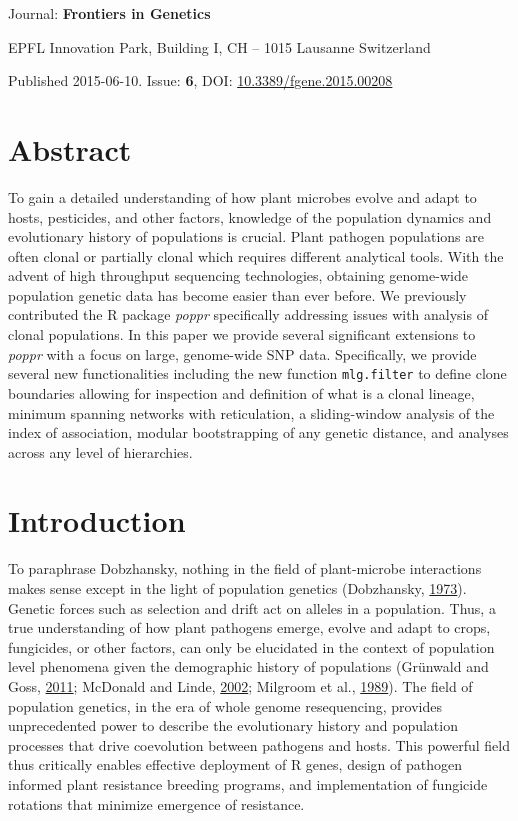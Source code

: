 \documentclass[double,12pt]{beavtex}
\begin{document}
  Journal: \textbf{Frontiers in Genetics}
  
  EPFL Innovation Park, Building I, CH -- 1015 Lausanne Switzerland
  
  Published 2015-06-10. Issue: \textbf{6}, DOI:
  \href{http://dx.doi.org/10.3389/fgene.2015.00208}{10.3389/fgene.2015.00208}
  
  \doublespacing
  \newpage
  
  \section{Abstract}\label{abstract-1}
  
  To gain a detailed understanding of how plant microbes evolve and adapt
  to hosts, pesticides, and other factors, knowledge of the population
  dynamics and evolutionary history of populations is crucial. Plant
  pathogen populations are often clonal or partially clonal which requires
  different analytical tools. With the advent of high throughput
  sequencing technologies, obtaining genome-wide population genetic data
  has become easier than ever before. We previously contributed the R
  package \emph{poppr} specifically addressing issues with analysis of
  clonal populations. In this paper we provide several significant
  extensions to \emph{poppr} with a focus on large, genome-wide SNP data.
  Specifically, we provide several new functionalities including the new
  function \texttt{mlg.filter} to define clone boundaries allowing for
  inspection and definition of what is a clonal lineage, minimum spanning
  networks with reticulation, a sliding-window analysis of the index of
  association, modular bootstrapping of any genetic distance, and analyses
  across any level of hierarchies.
  
  \section{Introduction}\label{introduction-1}
  
  To paraphrase Dobzhansky, nothing in the field of plant-microbe
  interactions makes sense except in the light of population genetics
  (Dobzhansky, \protect\hyperlink{ref-dobzhansky2013nothing}{1973}).
  Genetic forces such as selection and drift act on alleles in a
  population. Thus, a true understanding of how plant pathogens emerge,
  evolve and adapt to crops, fungicides, or other factors, can only be
  elucidated in the context of population level phenomena given the
  demographic history of populations (Grünwald and Goss,
  \protect\hyperlink{ref-grunwald2011evolution}{2011}; McDonald and Linde,
  \protect\hyperlink{ref-Mcdonald2002}{2002}; Milgroom et al.,
  \protect\hyperlink{ref-milgroom1989population}{1989}). The field of
  population genetics, in the era of whole genome resequencing, provides
  unprecedented power to describe the evolutionary history and population
  processes that drive coevolution between pathogens and hosts. This
  powerful field thus critically enables effective deployment of R genes,
  design of pathogen informed plant resistance breeding programs, and
  implementation of fungicide rotations that minimize emergence of
  resistance.
  
\end{document}
